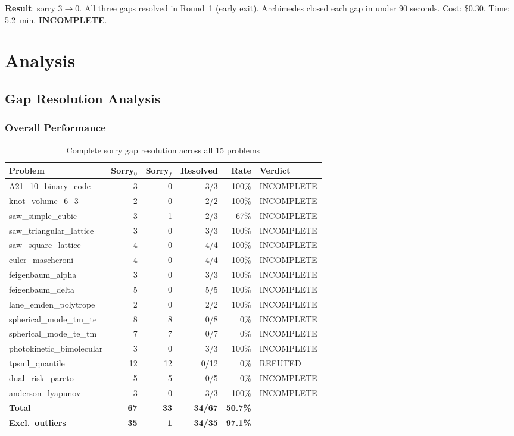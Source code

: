 \documentclass[12pt,a4paper]{report}
\theoremstyle{plain}
\theoremstyle{definition}
\theoremstyle{remark}
\newcommand{\verdict}[1]{\textbf{\textcolor{inkblue}{#1}}}
\begin{document}
\noindent\textbf{Result}: sorry $3 \to 0$. All three gaps resolved in Round~1 (early
exit). Archimedes closed each gap in under 90 seconds. Cost: \$0.30. Time: 5.2~min.
\verdict{INCOMPLETE}.

\part{Analysis}

\chapter{Gap Resolution Analysis}
\label{ch:analysis}

\section{Overall Performance}

\begin{table}[h!]
\centering
\begin{tabular}{lrrrrl}
\toprule
\textbf{Problem} & \textbf{Sorry$_0$} & \textbf{Sorry$_f$} & \textbf{Resolved}
  & \textbf{Rate} & \textbf{Verdict} \\
\midrule
A21\_10\_binary\_code & 3 & 0 & 3/3 & 100\% & INCOMPLETE \\
knot\_volume\_6\_3 & 2 & 0 & 2/2 & 100\% & INCOMPLETE \\
saw\_simple\_cubic & 3 & 1 & 2/3 & 67\% & INCOMPLETE \\
saw\_triangular\_lattice & 3 & 0 & 3/3 & 100\% & INCOMPLETE \\
saw\_square\_lattice & 4 & 0 & 4/4 & 100\% & INCOMPLETE \\
euler\_mascheroni & 4 & 0 & 4/4 & 100\% & INCOMPLETE \\
feigenbaum\_alpha & 3 & 0 & 3/3 & 100\% & INCOMPLETE \\
feigenbaum\_delta & 5 & 0 & 5/5 & 100\% & INCOMPLETE \\
lane\_emden\_polytrope & 2 & 0 & 2/2 & 100\% & INCOMPLETE \\
spherical\_mode\_tm\_te & 8 & 8 & 0/8 & 0\% & INCOMPLETE \\
spherical\_mode\_te\_tm & 7 & 7 & 0/7 & 0\% & INCOMPLETE \\
photokinetic\_bimolecular & 3 & 0 & 3/3 & 100\% & INCOMPLETE \\
tpsml\_quantile & 12 & 12 & 0/12 & 0\% & REFUTED \\
dual\_risk\_pareto & 5 & 5 & 0/5 & 0\% & INCOMPLETE \\
anderson\_lyapunov & 3 & 0 & 3/3 & 100\% & INCOMPLETE \\
\midrule
\textbf{Total} & \textbf{67} & \textbf{33} & \textbf{34/67} & \textbf{50.7\%} & \\
\textbf{Excl.\ outliers} & \textbf{35} & \textbf{1} & \textbf{34/35}
  & \textbf{97.1\%} & \\
\bottomrule
\end{tabular}
\caption{Complete sorry gap resolution across all 15 problems}
\label{tab:results}
\end{table}
\end{document}
